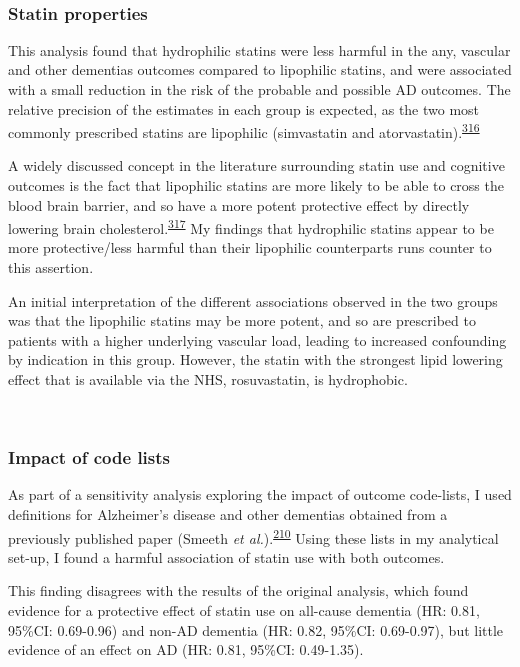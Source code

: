 \documentclass[a4paper, twoside]{templates/ociamthesis}
\begin{document}
~

\hypertarget{statin-properties-2}{%
\subsubsection{Statin properties}\label{statin-properties-2}}

This analysis found that hydrophilic statins were less harmful in the any, vascular and other dementias outcomes compared to lipophilic statins, and were associated with a small reduction in the risk of the probable and possible AD outcomes. The relative precision of the estimates in each group is expected, as the two most commonly prescribed statins are lipophilic (simvastatin and atorvastatin).\textsuperscript{\protect\hyperlink{ref-newman2019}{316}}

A widely discussed concept in the literature surrounding statin use and cognitive outcomes is the fact that lipophilic statins are more likely to be able to cross the blood brain barrier, and so have a more potent protective effect by directly lowering brain cholesterol.\textsuperscript{\protect\hyperlink{ref-shepardson2011}{317}} My findings that hydrophilic statins appear to be more protective/less harmful than their lipophilic counterparts runs counter to this assertion.

An initial interpretation of the different associations observed in the two groups was that the lipophilic statins may be more potent, and so are prescribed to patients with a higher underlying vascular load, leading to increased confounding by indication in this group. However, the statin with the strongest lipid lowering effect that is available via the NHS, rosuvastatin, is hydrophobic.

~

\hypertarget{impact-of-code-lists}{%
\subsubsection{Impact of code lists}\label{impact-of-code-lists}}

As part of a sensitivity analysis exploring the impact of outcome code-lists, I used definitions for Alzheimer's disease and other dementias obtained from a previously published paper (Smeeth \emph{et al.}).\textsuperscript{\protect\hyperlink{ref-smeeth2009}{210}} Using these lists in my analytical set-up, I found a harmful association of statin use with both outcomes.

This finding disagrees with the results of the original analysis, which found evidence for a protective effect of statin use on all-cause dementia (HR: 0.81, 95\%CI: 0.69-0.96) and non-AD dementia (HR: 0.82, 95\%CI: 0.69-0.97), but little evidence of an effect on AD (HR: 0.81, 95\%CI: 0.49-1.35).
\end{document}
